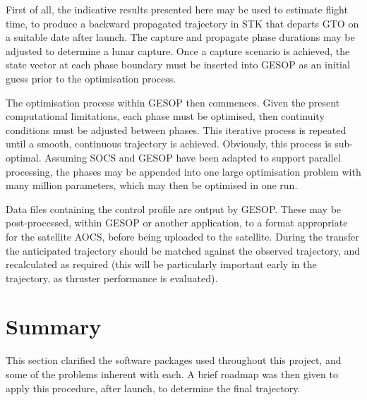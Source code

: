 First of all, the indicative results presented here may be used to estimate flight time, to produce a backward propagated trajectory in STK that departs GTO on a suitable date after launch. The capture and propagate phase durations may be adjusted to determine a lunar capture. Once a capture scenario is achieved, the state vector at each phase boundary must be inserted into GESOP as an initial guess prior to the optimisation process. 

The optimisation process within GESOP then commences. Given the present computational limitations, each phase must be optimised, then continuity conditions must be adjusted between phases. This iterative process is repeated until a smooth, continuous trajectory is achieved. Obviously, this process is sub-optimal. Assuming SOCS and GESOP have been adapted to support parallel processing, the phases may be appended into one large optimisation problem with many million parameters, which may then be optimised in one run.

Data files containing the control profile are output by GESOP. These may be post-processed, within GESOP or another application, to a format appropriate for the satellite AOCS, before being uploaded to the satellite. During the transfer the anticipated trajectory should be matched against the observed trajectory, and recalculated as required (this will be particularly important early in the trajectory, as thruster performance is evaluated).

\section{Summary} \label{sec:Method-summary}

This section clarified the software packages used throughout this project, and some of the problems inherent with each. A brief roadmap was then given to apply this procedure, after launch, to determine the final trajectory.

  
\clearpage